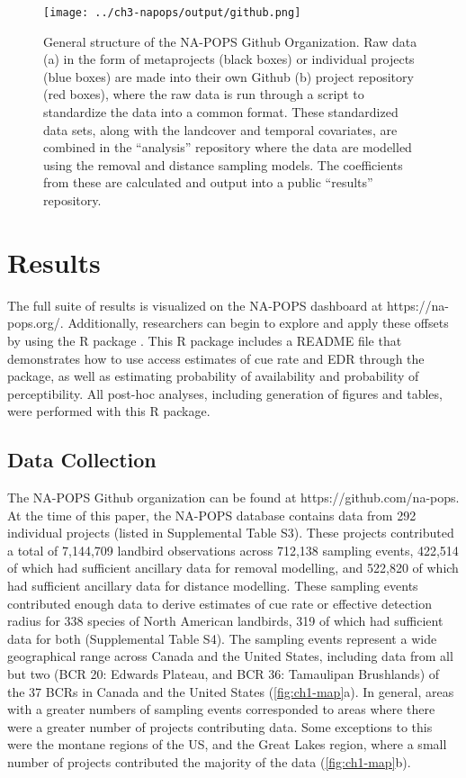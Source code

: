 \begin{figure}[h]
	\centering
	\texttt{[image: ../ch3-napops/output/github.png]}
	\caption{\label{fig:github}General structure of the NA-POPS Github Organization.  Raw data (a) in the form of metaprojects (black boxes) or individual projects (blue boxes) are made into their own Github (b) project repository (red boxes), where the raw data is run through a script to standardize the data into a common format. These standardized data sets, along with the landcover and temporal covariates, are combined in the “analysis” repository where the data are modelled using the removal and distance sampling models. The coefficients from these are calculated and output into a public “results” repository.}
\end{figure}

\section{Results}

The full suite of results is visualized on the NA-POPS dashboard at https://na-pops.org/. Additionally, researchers can begin to explore and apply these offsets by using the R package  \citep{edwards_napops_2022}. This R package includes a README file that demonstrates how to use access estimates of cue rate and EDR through the package, as well as estimating probability of availability and probability of perceptibility. All post-hoc analyses, including generation of figures and tables, were performed with this R package. 

\subsection{Data Collection}
\par The NA-POPS Github organization can be found at https://github.com/na-pops. At the time of this paper, the NA-POPS database contains data from 292 individual projects (listed in Supplemental Table S3). These projects contributed a total of 7,144,709 landbird observations across 712,138 sampling events, 422,514 of which had sufficient ancillary data for removal modelling, and 522,820 of which had sufficient ancillary data for distance modelling. These sampling events contributed enough data to derive estimates of cue rate or effective detection radius for 338 species of North American landbirds, 319 of which had sufficient data for both (Supplemental Table S4). The sampling events represent a wide geographical range across Canada and the United States, including data from all but two (BCR 20: Edwards Plateau, and BCR 36: Tamaulipan Brushlands) of the 37 BCRs in Canada and the United States (\autoref{fig:ch1-map}a). In general, areas with a greater numbers of sampling events corresponded to areas where there were a greater number of projects contributing data. Some exceptions to this were the montane regions of the US, and the Great Lakes region, where a small number of projects contributed the majority of the data (\autoref{fig:ch1-map}b).

